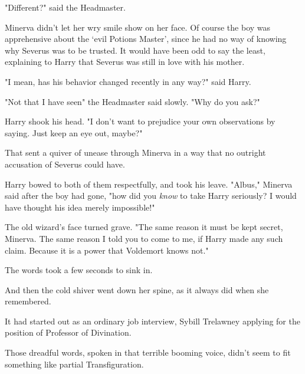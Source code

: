 "Different?" said the Headmaster.

Minerva didn't let her wry smile show on her face. Of course the boy was
apprehensive about the `evil Potions Master', since he had no way of knowing
why Severus was to be trusted. It would have been odd to say the least,
explaining to Harry that Severus was still in love with his mother.

"I mean, has his behavior changed recently in any way?" said Harry.

"Not that I have seen{\el}" the Headmaster said slowly. "Why do you ask?"

Harry shook his head. "I don't want to prejudice your own observations by
saying. Just keep an eye out, maybe?"

That sent a quiver of unease through Minerva in a way that no outright
accusation of Severus could have.

Harry bowed to both of them respectfully, and took his leave.
\sbreak
"Albus," Minerva said after the boy had gone, "how did you \emph{know} to take
Harry seriously? I would have thought his idea merely impossible!"

The old wizard's face turned grave. "The same reason it must be kept secret,
Minerva. The same reason I told you to come to me, if Harry made any such
claim. Because it is a power that Voldemort knows not."

The words took a few seconds to sink in.

And then the cold shiver went down her spine, as it always did when she
remembered.

It had started out as an ordinary job interview, Sybill Trelawney applying for
the position of Professor of Divination.

\begin{thought}
\end{thought}

Those dreadful words, spoken in that terrible booming voice, didn't seem to fit
something like partial Transfiguration.

